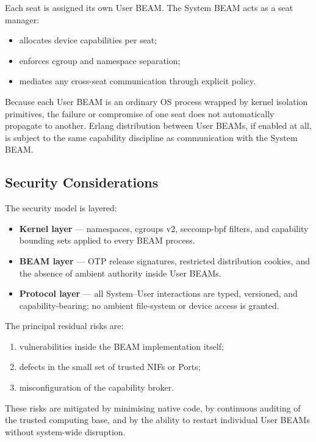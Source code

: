 \documentclass{article}
\begin{document}
Each seat is assigned its own User BEAM.
The System BEAM acts as a seat manager:
\begin{itemize}[nosep]
  \item allocates device capabilities per seat;
  \item enforces cgroup and namespace separation;
  \item mediates any cross-seat communication through explicit policy.
\end{itemize}

Because each User BEAM is an ordinary OS process wrapped by kernel isolation primitives, the failure or compromise of one seat does not automatically propagate to another.
Erlang distribution between User BEAMs, if enabled at all, is subject to the same capability discipline as communication with the System BEAM.

\subsection{Security Considerations}

The security model is layered:

\begin{itemize}
  \item \textbf{Kernel layer} --- namespaces, cgroups v2, seccomp-bpf filters, and capability bounding sets applied to every BEAM process.
  \item \textbf{BEAM layer} --- OTP release signatures, restricted distribution cookies, and the absence of ambient authority inside User BEAMs.
  \item \textbf{Protocol layer} --- all System--User interactions are typed, versioned, and capability-bearing; no ambient file-system or device access is granted.
\end{itemize}

The principal residual risks are:
\begin{enumerate}[nosep]
  \item vulnerabilities inside the BEAM implementation itself;
  \item defects in the small set of trusted NIFs or Ports;
  \item misconfiguration of the capability broker.
\end{enumerate}

These risks are mitigated by minimising native code, by continuous auditing of the trusted computing base, and by the ability to restart individual User BEAMs without system-wide disruption.
\end{document}
